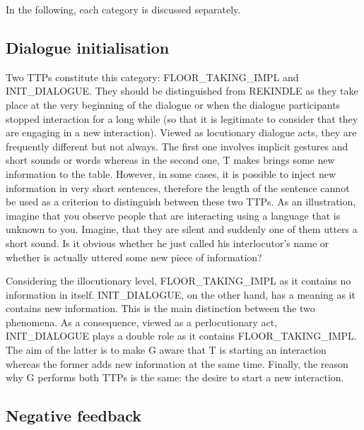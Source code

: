     In the following, each category is discussed separately.


    \subsection{Dialogue initialisation}
    \label{tax:dialinit}
		
         Two TTPs constitute this category: FLOOR\_TAKING\_IMPL and INIT\_DIALOGUE. They should be distinguished from REKINDLE as they take place at the very beginning of the dialogue or when the dialogue participants stopped interaction for a long while (so that it is legitimate to consider that they are engaging in a new interaction). Viewed as locutionary dialogue acts, they are frequently different but not always. The first one involves implicit gestures and short sounds or words whereas in the second one, T makes brings some new information to the table. However, in some cases, it is possible to inject new information in very short sentences, therefore the length of the sentence cannot be used as a criterion to distinguish between these two TTPs. As an illustration, imagine that you observe people that are interacting using a language that is unknown to you. Imagine, that they are silent and suddenly one of them utters a short sound. Is it obvious whether he just called his interlocutor's name or whether is actually uttered some new piece of information?
			
	 Considering the illocutionary level, FLOOR\_TAKING\_IMPL as it contains no information in itself. INIT\_DIALOGUE, on the other hand, has a meaning as it contains new information. This is the main distinction between the two phenomena. As a consequence, viewed as a perlocutionary act, INIT\_DIALOGUE plays a double role as it contains FLOOR\_TAKING\_IMPL. The aim of the latter is to make G aware that T is starting an interaction whereas the former adds new information at the same time. Finally, the reason why G performs both TTPs is the same: the desire to start a new interaction.               

    \subsection{Negative feedback}

